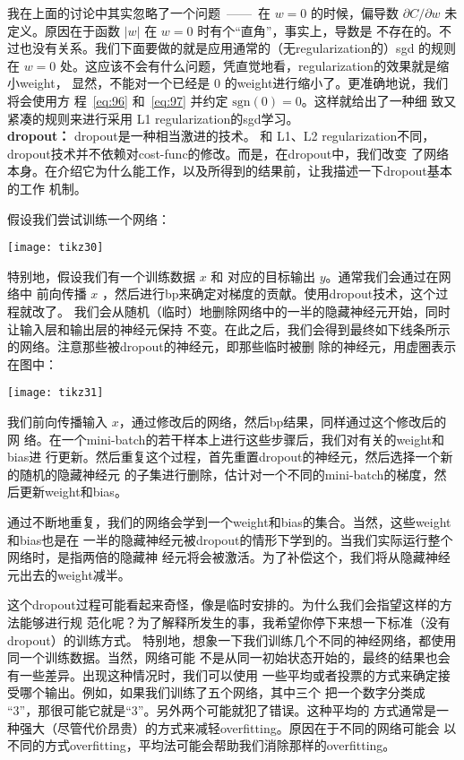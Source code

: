 我在上面的讨论中其实忽略了一个问题~——~在 $w=0$ 的时候，偏导数 $\partial
C/\partial w$ 未定义。原因在于函数 $|w|$ 在 $w=0$ 时有个“直角”，事实上，导数是
不存在的。不过也没有关系。我们下面要做的就是应用通常的（无\gls*{regularization}的）\gls*{sgd}
的规则在 $w=0$ 处。这应该不会有什么问题，凭直觉地看，\gls*{regularization}的效果就是缩小\gls*{weight}，
显然，不能对一个已经是 $0$ 的\gls*{weight}进行缩小了。更准确地说，我们将会使用方
程~\eqref{eq:96} 和~\eqref{eq:97} 并约定 $\mbox{sgn}(0) = 0$。这样就给出了一种细
致又紧凑的规则来进行采用 L1 \gls*{regularization}的\gls*{sgd}学习。\\

\textbf{\gls{dropout}：} \gls*{dropout}是一种相当激进的技术。
和 L1、L2 \gls*{regularization}不同，\gls*{dropout}技术并不依赖对\gls*{cost-func}的修改。而是，在\gls*{dropout}中，我们改变
了网络本身。在介绍它为什么能工作，以及所得到的结果前，让我描述一下\gls*{dropout}基本的工作
机制。

假设我们尝试训练一个网络：
\begin{center}
  \texttt{[image: tikz30]}
\end{center}

特别地，假设我们有一个训练数据 $x$ 和 对应的目标输出 $y$。通常我们会通过在网络中
前向传播 $x$ ，然后进行\gls*{bp}来确定对梯度的贡献。使用\gls*{dropout}技术，这个过程就改了。
我们会从随机（临时）地删除网络中的一半的隐藏神经元开始，同时让输入层和输出层的神经元保持
不变。在此之后，我们会得到最终如下线条所示的网络。注意那些被\gls*{dropout}的神经元，即那些临时被删
除的神经元，用虚圈表示在图中：
\begin{center}
  \texttt{[image: tikz31]}
\end{center}

我们前向传播输入 $x$，通过修改后的网络，然后\gls*{bp}结果，同样通过这个修改后的网
络。在一个\gls*{mini-batch}的若干样本上进行这些步骤后，我们对有关的\gls*{weight}和\gls*{bias}进
行更新。然后重复这个过程，首先重置\gls*{dropout}的神经元，然后选择一个新的随机的隐藏神经元
的子集进行删除，估计对一个不同的\gls*{mini-batch}的梯度，然后更新\gls*{weight}和\gls*{bias}。

通过不断地重复，我们的网络会学到一个\gls*{weight}和\gls*{bias}的集合。当然，这些\gls*{weight}和\gls*{bias}也是在
一半的隐藏神经元被\gls*{dropout}的情形下学到的。当我们实际运行整个网络时，是指两倍的隐藏神
经元将会被激活。为了补偿这个，我们将从隐藏神经元出去的\gls*{weight}减半。

这个\gls*{dropout}过程可能看起来奇怪，像是临时安排的。为什么我们会指望这样的方法能够进行规
范化呢？为了解释所发生的事，我希望你停下来想一下标准（没有\gls*{dropout}）的训练方式。
特别地，想象一下我们训练几个不同的神经网络，都使用同一个训练数据。当然，网络可能
不是从同一初始状态开始的，最终的结果也会有一些差异。出现这种情况时，我们可以使用
一些平均或者投票的方式来确定接受哪个输出。例如，如果我们训练了五个网络，其中三个
把一个数字分类成 “3”，那很可能它就是“3”。另外两个可能就犯了错误。这种平均的
方式通常是一种强大（尽管代价昂贵）的方式来减轻\gls*{overfitting}。原因在于不同的网络可能会
以不同的方式\gls*{overfitting}，平均法可能会帮助我们消除那样的\gls*{overfitting}。

